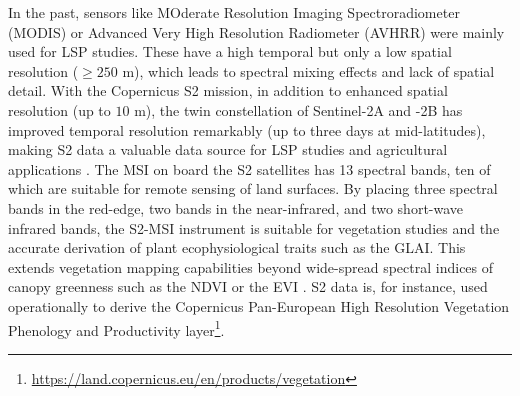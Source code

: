 In the past, sensors like MOderate Resolution Imaging Spectroradiometer (MODIS) or Advanced Very High Resolution Radiometer (AVHRR) were mainly used for \gls{LSP} studies. These have a high temporal but only a low spatial resolution ($\ge250$ m), which leads to spectral mixing effects \citep{helman_land_2018} and lack of spatial detail. With the Copernicus \gls{S2} mission, in addition to enhanced spatial resolution (up to $10$ m), the twin constellation of Sentinel-2A and -2B has improved temporal resolution remarkably (up to three days at mid-latitudes), making \gls{S2} data a valuable data source for \gls{LSP} studies and agricultural applications \citep{bolton_continental-scale_2020,tian_calibrating_2021,moon_multiscale_2021,amin_prototyping_2021,pazur_national_2022}. The \gls{MSI} on board the \gls{S2} satellites has 13 spectral bands, ten of which are suitable for remote sensing of land surfaces. By placing three spectral bands in the red-edge, two bands in the near-infrared, and two short-wave infrared bands, the \gls{S2}-\gls{MSI} instrument is suitable for vegetation studies \citep{frampton_evaluating_2013, misra_status_2020} and the accurate derivation of plant ecophysiological traits such as the \gls{GLAI}. This extends vegetation mapping capabilities beyond wide-spread spectral indices of canopy greenness such as the \gls{NDVI} \citep{rouse_monitoring_1974} or the \gls{EVI} \citep{huete_overview_2002}. \gls{S2} data is, for instance, used operationally to derive the Copernicus Pan-European High Resolution Vegetation Phenology and Productivity layer\footnote{\url{https://land.copernicus.eu/en/products/vegetation}}.

